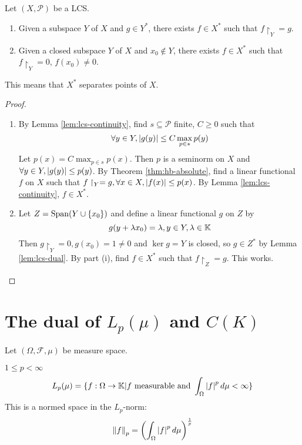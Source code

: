 \documentclass{article}
\begin{document}
\begin{nthm}\label{thm:hb-lcs}
  Let $(X, \mathcal P)$ be a LCS.
  \begin{enumerate}
    \item Given a subspace $Y$ of $X$ and $g \in Y^*$, there exists $f \in X^*$ such that $f\restriction_Y = g$.
    \item Given a closed subspace $Y$ of $X$ and $x_0 \nin Y$, there exists $f \in X^*$ such that $f\restriction_Y = 0$, $f(x_0) \ne 0$.
  \end{enumerate}
\end{nthm}
\begin{rmk}
  This means that $X^*$ separates points of $X$.
\end{rmk}
\begin{proof}~
  \begin{enumerate}
    \item By Lemma \ref{lem:lcs-continuity}, find $s \subseteq \mathcal P$ finite, $C \ge 0$ such that
    $$\forall y \in Y, \left\lvert g(y)\right\rvert \le C\max_{p \in s}p(y)$$
    Let $p(x) = C\max_{p \in s}p(x)$. Then $p$ is a seminorm on $X$ and $\forall y \in Y, \left\lvert g(y)\right\rvert \le p(y)$. By Theorem \ref{thm:hb-absolute}, find a linear functional $f$ on $X$ such that $f\restriction_Y = g, \forall x \in X, \left\lvert f(x)\right\rvert \le p(x)$. By Lemma \ref{lem:lcs-continuity}, $f \in X^*$.
    \item Let $Z = \mathrm{Span}(Y \cup \{x_0\})$ and define a linear functional $g$ on $Z$ by
    $$g(y + \lambda x_0) = \lambda, y \in Y, \lambda \in \mathbb K$$
    Then $g\restriction_Y = 0, g(x_0) = 1 \ne 0$ and $\ker g = Y$ is closed, so $g \in Z^*$ by Lemma \ref{lem:lcs-dual}. By part (i), find $f \in X^*$ such that $f\restriction_Z = g$. This works.
  \end{enumerate}
\end{proof}

\clearpage

\section{The dual of \texorpdfstring{$L_p(\mu)$ and $C(K)$}{Lp(mu) or C(K)}}

Let $(\Omega, \mathcal F, \mu)$ be measure space.

$1 \le p < \infty$
$$L_p(\mu) = \{f : \Omega \rightarrow \mathbb K | f \text{ measurable and } \int_\Omega \left\lvert f\right\rvert^p d\mu < \infty\}$$
This is a normed space in the $L_p$-norm:
$$\left\lVert f\right\rVert_p = \left(\int_\Omega \left\lvert f\right\rvert^p d\mu\right)^{\frac 1p}$$
\end{document}
